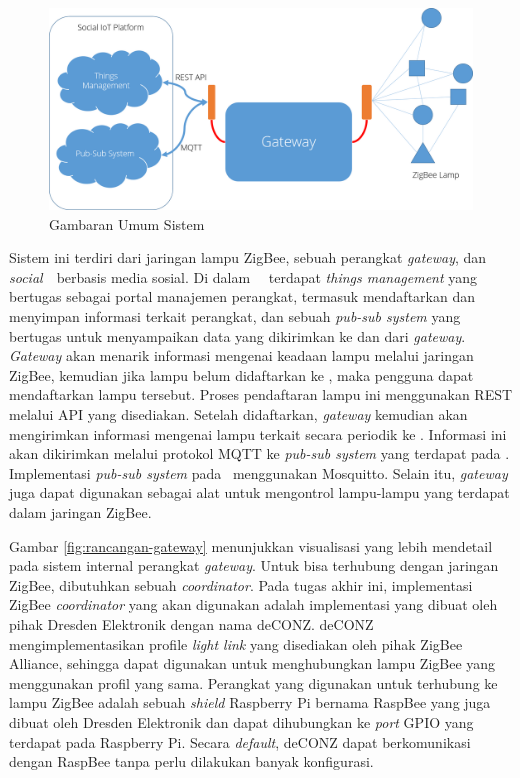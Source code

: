 \begin{figure}
	\centering
	\includegraphics[width=.9\textwidth]{pics/rancangan-sistem.PNG}
	\caption{Gambaran Umum Sistem}
	\label{fig:rancangan-sistem}
\end{figure}

Sistem ini terdiri dari jaringan lampu ZigBee, sebuah perangkat \textit{gateway}, dan \textit{social}\iot~\plat~berbasis media sosial. Di dalam \plat~\iot~terdapat \textit{things management} yang bertugas sebagai portal manajemen perangkat, termasuk mendaftarkan dan menyimpan informasi terkait perangkat, dan sebuah \textit{pub-sub system} yang bertugas untuk menyampaikan data yang dikirimkan ke dan dari \textit{gateway}. \textit{Gateway} akan menarik informasi mengenai keadaan lampu melalui jaringan ZigBee, kemudian jika lampu belum didaftarkan ke \plat, maka pengguna dapat mendaftarkan lampu tersebut. Proses pendaftaran lampu ini menggunakan REST melalui API yang disediakan. Setelah didaftarkan, \textit{gateway} kemudian akan mengirimkan informasi mengenai lampu terkait secara periodik ke \plat. Informasi ini akan dikirimkan melalui protokol MQTT ke \textit{pub-sub system} yang terdapat pada \plat. Implementasi \textit{pub-sub system} pada \plat~menggunakan Mosquitto. Selain itu, \textit{gateway} juga dapat digunakan sebagai alat untuk mengontrol lampu-lampu yang terdapat dalam jaringan ZigBee.

Gambar \ref{fig:rancangan-gateway} menunjukkan visualisasi yang lebih mendetail pada sistem internal perangkat \textit{gateway}. Untuk bisa terhubung dengan jaringan ZigBee, dibutuhkan sebuah \textit{coordinator}. Pada tugas akhir ini, implementasi ZigBee \textit{coordinator} yang akan digunakan adalah implementasi yang dibuat oleh pihak Dresden Elektronik dengan nama deCONZ. deCONZ mengimplementasikan profile \textit{light link} yang disediakan oleh pihak ZigBee Alliance, sehingga dapat digunakan untuk menghubungkan lampu ZigBee yang menggunakan profil yang sama. Perangkat yang digunakan untuk terhubung ke lampu ZigBee adalah sebuah \textit{shield} Raspberry Pi bernama RaspBee yang juga dibuat oleh Dresden Elektronik dan dapat dihubungkan ke \textit{port} GPIO yang terdapat pada Raspberry Pi. Secara \textit{default}, deCONZ dapat berkomunikasi dengan RaspBee tanpa perlu dilakukan banyak konfigurasi.

